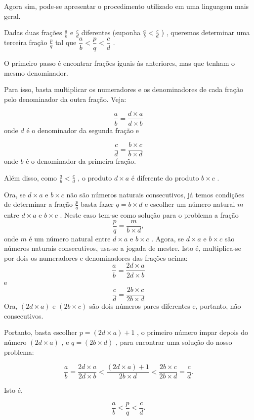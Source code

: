 \documentclass[a4,12pt]{book}
\begin{document}
\begin{refletindo*}[breakable]{}{}
  Agora sim, pode-se apresentar o procedimento utilizado em uma linguagem mais geral.  
  
  Dadas duas frações   $\frac{a}{b}$   e   $\frac{c}{d}$   diferentes (suponha   $\frac{a}{b}<\frac{c}{d}$  ) , queremos determinar uma terceira fração   $\frac{p}{q}$   tal que   $\dfrac{a}{b}<\dfrac{p}{q}<\dfrac{c}{d}$  .  
  
  O primeiro passo é encontrar frações iguais às anteriores, mas que tenham o mesmo denominador.  
  
  Para isso, basta multiplicar os numeradores e os denominadores de cada fração pelo denominador da outra fração. Veja:  
  
  $$\dfrac{a}{b} = \dfrac{d \times a}{d \times b}$$  
  onde   $d$   é o denominador da segunda fração e  
  
  $$\dfrac{c}{d} = \dfrac{b \times c}{b \times d}$$  
  onde   $b$   é o denominador da primeira fração.  
  
  Além disso, como   $\frac{a}{b}<\frac{c}{d}$  , o produto   $d \times a$   é diferente do produto   $b \times c$  .  
  
  Ora, se   $d \times a$   e   $b \times c$   não são números naturais consecutivos, já temos condições de determinar a fração   $\frac{p}{q}$   basta fazer   $q = b \times d$   e escolher um número natural   $m$   entre   $d \times a$   e   $b \times c$  . Neste caso tem-se como solução para o problema a fração  
  $$\dfrac{p}{q} = \dfrac{m}{b \times d},$$     
  onde   $m$   é um número natural entre   $d \times a$   e   $b \times c$  .  
  Agora, se   $d \times a$   e   $b \times c$   são números naturais consecutivos, usa-se a jogada de mestre. Isto é, multiplica-se por dois os numeradores e denominadores das frações acima:  
  $$\dfrac{a}{b} = \dfrac{2d \times a}{2d \times b}$$  
  e  
  $$\dfrac{c}{d} = \dfrac{2b \times c}{2b \times d}$$  
  Ora,   $(2d \times a)$    e   $(2b \times c)$   são dois números pares diferentes e, portanto, não consecutivos.   
  
  Portanto, basta escolher   $p = (2d \times a) + 1$  , o primeiro número ímpar depois do número    $(2d \times a)$  ,  e   $q=(2b \times d)$  , para encontrar uma solução do nosso problema:  
  
  $$\dfrac{a}{b} = \dfrac{2d \times a}{2d \times b} < \dfrac{(2d \times a) + 1}{2b \times d} <  \dfrac{2b \times c}{2b \times d} = \dfrac{c}{d}.$$  
  
  Isto é,   
  
  $$\dfrac{a}{b} < \dfrac{p}{q} < \dfrac{c}{d}.$$  
  
\end{refletindo*}
\end{document}
